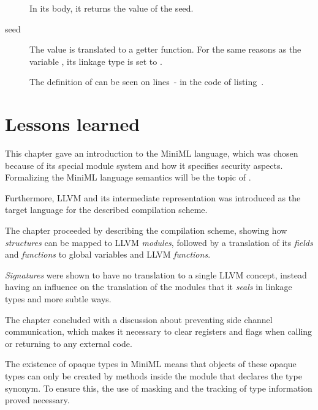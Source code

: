 \begin{description}
In its body, it returns the value of the seed.

\item[seed] The value  is translated to a getter function.
For the same reasons as the variable , its linkage type is set to . 

The definition of  can be seen on lines~- in the code of listing~.
\end{description}

\section{Lessons learned}

This chapter gave an introduction to the \mbox{MiniML} language, which was chosen because of its special module system and how it specifies security aspects. Formalizing the \mbox{MiniML} language semantics will be the topic of .

Furthermore, LLVM and its intermediate representation was introduced as the target language for the described compilation scheme.

The chapter proceeded by describing the compilation scheme, showing how \emph{structures} can be mapped to LLVM \emph{modules}, followed by a translation of its \emph{fields} and \emph{functions} to global variables and LLVM \emph{functions}.

\emph{Signatures} were shown to have no translation to a single LLVM concept, instead having an influence on the translation of the modules that it \emph{seals} in linkage types and more subtle ways.

The chapter concluded with a discussion about preventing side channel communication, which makes it necessary to clear registers and flags when calling or returning to any external code.

The existence of opaque types in \mbox{MiniML} means that objects of these opaque types can only be created by methods inside the module that declares the type synonym. To ensure this, the use of masking and the tracking of type information proved necessary.
